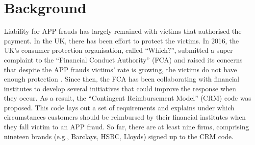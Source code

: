 
\section{Background}\label{sec::background}



Liability for  APP frauds has largely remained with  victims  that authorised the payment.  In the UK,  there has been  effort  to protect the victims. In  2016, the UK's consumer protection organisation, called ``Which?'', submitted a super-complaint to the
 ``Financial Conduct Authority” (FCA) and  raised its concerns that despite the APP frauds victims' rate is  growing, the victims do not have enough protection \cite{Which?-super-complaint}.  Since then, the FCA has been collaborating with financial institutes  to develop several initiatives that
could  improve the response when they  occur. As a result,  the ``Contingent Reimbursement Model'' (CRM)  code  \cite{CRM-code} was proposed. This code  lays out a set of requirements and explains under which circumstances customers should be reimbursed by their  financial institutes when they fall victim to an APP fraud. So far,  there are at least nine firms, comprising nineteen brands (e.g., Barclays, HSBC,  Lloyds) signed up to the CRM code. 


